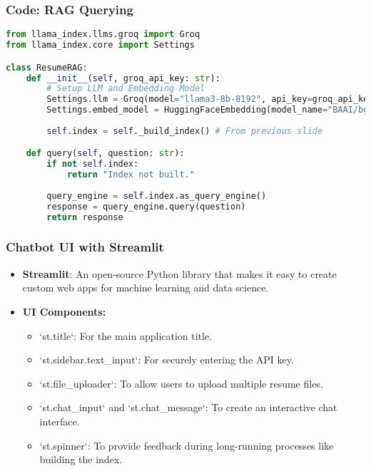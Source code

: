 \begin{frame}[fragile]\frametitle{Code: RAG Querying}
    \begin{lstlisting}[language=Python, basicstyle=\tiny, caption={llm\_llamaindex\_rag.py - Querying}]
from llama_index.llms.groq import Groq
from llama_index.core import Settings

class ResumeRAG:
    def __init__(self, groq_api_key: str):
        # Setup LLM and Embedding Model
        Settings.llm = Groq(model="llama3-8b-8192", api_key=groq_api_key)
        Settings.embed_model = HuggingFaceEmbedding(model_name="BAAI/bge-small-en-v1.5")
        
        self.index = self._build_index() # From previous slide

    def query(self, question: str):
        if not self.index:
            return "Index not built."
            
        query_engine = self.index.as_query_engine()
        response = query_engine.query(question)
        return response
    \end{lstlisting}
\end{frame}

\begin{frame}[fragile]\frametitle{Chatbot UI with Streamlit}
    \begin{itemize}
        \item \textbf{Streamlit}: An open-source Python library that makes it easy to create custom web apps for machine learning and data science.
        \item \textbf{UI Components:}
        \begin{itemize}
            \item `st.title`: For the main application title.
            \item `st.sidebar.text\_input`: For securely entering the API key.
            \item `st.file\_uploader`: To allow users to upload multiple resume files.
            \item `st.chat\_input` and `st.chat\_message`: To create an interactive chat interface.
            \item `st.spinner`: To provide feedback during long-running processes like building the index.
        \end{itemize}
    \end{itemize}
\end{frame}


